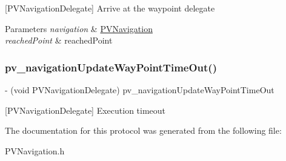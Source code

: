 \mbox{[}P\+V\+Navigation\+Delegate\mbox{]} Arrive at the waypoint delegate


\begin{DoxyParams}{Parameters}
{\em navigation} & \hyperlink{interface_p_v_navigation}{P\+V\+Navigation} \\
\hline
{\em reached\+Point} & reached\+Point \\
\hline
\end{DoxyParams}
\mbox{\label{protocol_p_v_navigation_delegate_01-p_af1bd3b2e116b675579e725590ba3f5bf}} 
\subsubsection{\texorpdfstring{pv\+\_\+navigation\+Update\+Way\+Point\+Time\+Out()}{pv\_navigationUpdateWayPointTimeOut()}}
{\footnotesize\ttfamily -\/ (void P\+V\+Navigation\+Delegate) pv\+\_\+navigation\+Update\+Way\+Point\+Time\+Out \begin{DoxyParamCaption}{ }\end{DoxyParamCaption}\hspace{0.3cm}{\ttfamily [optional]}}

\mbox{[}P\+V\+Navigation\+Delegate\mbox{]} Execution timeout 

The documentation for this protocol was generated from the following file\+:\begin{DoxyCompactItemize}
\item 
P\+V\+Navigation.\+h\end{DoxyCompactItemize}

